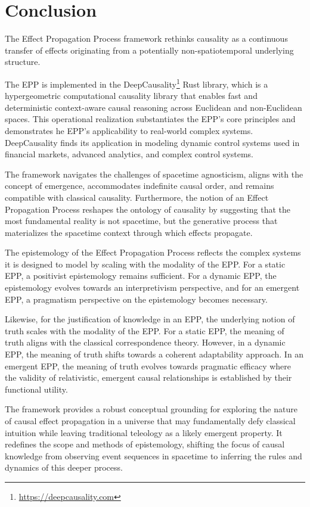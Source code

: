 \documentclass{article}
\begin{document}
\newpage

\section{Conclusion}
\label{sec:conclusion}

The Effect Propagation Process framework rethinks causality as a continuous transfer of effects originating from a potentially non-spatiotemporal underlying structure. 

The EPP is implemented in the DeepCausality\footnote{\url{https://deepcausality.com}} Rust library, which is a hypergeometric computational causality library that enables fast and deterministic context-aware causal reasoning across Euclidean and non-Euclidean spaces. This operational realization substantiates the EPP’s core principles and demonstrates he EPP’s applicability to real-world complex systems.  DeepCausality finds its application in modeling dynamic control systems used in financial markets, advanced analytics, and complex control systems.

The framework navigates the challenges of spacetime agnosticism, aligns with the concept of emergence, accommodates indefinite causal order, and remains compatible with classical causality. Furthermore, the notion of an Effect Propagation Process reshapes the ontology of causality by suggesting that the most fundamental reality is not spacetime, but the generative process that materializes the spacetime context through which effects propagate.

The epistemology of the Effect Propagation Process reflects the complex systems it is designed to model by scaling with the modality of the EPP. For a static EPP, a positivist epistemology remains sufficient. For a dynamic EPP, the epistemology evolves towards an interpretivism perspective, and for an emergent EPP, a pragmatism perspective on the epistemology becomes necessary.

Likewise, for the justification of knowledge in an EPP, the underlying notion of truth scales with the modality of the EPP. For a static EPP, the meaning of truth aligns with the classical correspondence theory. However, in a dynamic EPP, the meaning of truth shifts towards a coherent adaptability approach. In an emergent EPP, the meaning of truth evolves towards pragmatic efficacy where the validity of relativistic, emergent causal relationships is established by their functional utility.

The framework provides a robust conceptual grounding for exploring the nature of causal effect propagation in a universe that may fundamentally defy classical intuition while leaving traditional teleology as a likely emergent property. It redefines the scope and methods of epistemology, shifting the focus of causal knowledge from observing event sequences in spacetime to inferring the rules and dynamics of this deeper process.
\end{document}

